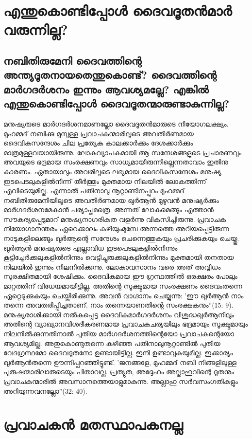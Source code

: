 \chapter{ എന്തുകൊണ്ടിപ്പോള്‍ ദൈവദൂതന്‍മാര്‍ വരുന്നില്ല? }
\section{  നബിതിരുമേനി ദൈവത്തിന്റെ അന്ത്യദൂതനായതെന്തുകൊണ്ട്? ദൈവത്തിന്റെ മാര്‍ഗദര്‍ശനം ഇന്നും ആവശ്യമല്ലേ? എങ്കില്‍ എന്തുകൊണ്ടിപ്പോള്‍ ദൈവദൂതന്മാരുണ്ടാകുന്നില്ല?}

 മനുഷ്യരുടെ മാര്‍ഗദര്‍ശനമാണല്ലോ ദൈവദൂതന്‍മാരുടെ നിയോഗലക്ഷ്യം. മുഹമ്മദ് നബിക്കു മുമ്പുള്ള പ്രവാചകന്മാരിലൂടെ അവതീര്‍ണമായ ദൈവികസന്ദേശം ചില പ്രത്യേക കാലക്കാര്‍ക്കും ദേശക്കാര്‍ക്കും മാത്രമുള്ളവയായിരുന്നു. ലോകവ്യാപകമായി ആ സന്ദേശങ്ങളുടെ പ്രചാരണവും അവയുടെ ഭദ്രമായ സംരക്ഷണവും സാധ്യമായിരുന്നില്ലെന്നതാവാം ഇതിനു കാരണം. ഏതായാലും അവരിലൂടെ ലഭ്യമായ ദൈവികസന്ദേശം മനുഷ്യ ഇടപെടലുകളില്‍നിന്ന് തീര്‍ത്തും മുക്തമായ നിലയില്‍ ലോകത്തിന്ന് എവിടെയുമില്ല. എന്നാല്‍ പതിനാലു നൂറ്റാണ്ടിനപ്പുറം മുഹമ്മദ് നബിതിരുമേനിയിലൂടെ അവതീര്‍ണമായ ഖുര്‍ആന്‍ മുഴുവന്‍ മനുഷ്യര്‍ക്കും മാര്‍ഗദര്‍ശനമേകാന്‍ പര്യാപ്തമത്രെ. അന്നത് ലോകമെങ്ങും എത്താന്‍ സൗകര്യപ്പെടുമാറ് മനുഷ്യനാഗരികത വളര്‍ന്നു വികസിച്ചിരുന്നു. പ്രവാചക നിയോഗാനന്തരം ഏറെക്കാലം കഴിയുംമുമ്പേ അന്നത്തെ അറിയപ്പെട്ടിരുന്ന നാടുകളിലെങ്ങും ഖുര്‍ആന്റെ സന്ദേശം ചെന്നെത്തുകയും പ്രചരിക്കുകയും ചെയ്തു. ഖുര്‍ആന്‍ മനുഷ്യരുടെ എല്ലാവിധ ഇടപെടലുകളില്‍നിന്നും കൂട്ടിച്ചേര്‍ക്കലുകളില്‍നിന്നും വെട്ടിച്ചുരുക്കലുകളില്‍നിന്നും മുക്തമായി തനതായ നിലയില്‍ ഇന്നും നിലനില്‍ക്കുന്നു. ലോകാവസാനം വരെ അത് അവ്വിധം സുരക്ഷിതമായി ശേഷിക്കും. ദൈവികമായ ഈ ഗ്രന്ഥത്തില്‍ ഒരക്ഷരം പോലും മാറ്റത്തിന് വിധേയമായിട്ടില്ല. അതിന്റെ സൂക്ഷ്മമായ സംരക്ഷണം ദൈവംതന്നെ ഏറ്റെടുക്കുകയും ചെയ്തിരിക്കുന്നു. അവന്‍ വാഗ്ദാനം ചെയ്യുന്നു: 'ഈ ഖുര്‍ആന്‍ നാം തന്നെ അവതരിപ്പിച്ചതാണ്. നാം തന്നെയാണതിന്റെ സംരക്ഷകനും''(15: 9).
മനുഷ്യരാശിക്കായി നല്‍കപ്പെട്ട ദൈവികമാര്‍ഗദര്‍ശനം വിശുദ്ധഖുര്‍ആനിലും അതിന്റെ വ്യാഖ്യാനവിശദീകരണമായ പ്രവാചകചര്യയിലും ഭദ്രമായും സൂക്ഷ്മമായും നിലനില്‍ക്കുന്നതിനാല്‍ പുതിയ മാര്‍ഗദര്‍ശനത്തിന്റെയോ പ്രവാചകന്റെയോ ആവശ്യമില്ല. അതുകൊണ്ടുതന്നെ കഴിഞ്ഞ പതിനാലുനൂറ്റാണ്ടില്‍ പുതിയ വേദഗ്രന്ഥമോ ദൈവദൂതനോ ഉണ്ടായിട്ടില്ല. ഇനി ഉണ്ടാവുകയുമില്ല. ഇക്കാര്യം ഖുര്‍ആന്‍തന്നെ ഊന്നിപ്പറഞ്ഞിട്ടുണ്ട്. 'ജനങ്ങളേ, മുഹമ്മദ് നബി നിങ്ങളിലുള്ള പുരുഷന്മാരിലാരുടെയും പിതാവല്ല. പ്രത്യുത, അദ്ദേഹം അല്ലാഹുവിന്റെ ദൂതനും പ്രവാചകന്മാരില്‍ അവസാനത്തെയാളുമാകുന്നു. അല്ലാഹു സര്‍വസംഗതികളും അറിയുന്നവനല്ലോ''(32: 40).

\chapter{പ്രവാചകന്‍ മതസ്ഥാപകനല്ല }
